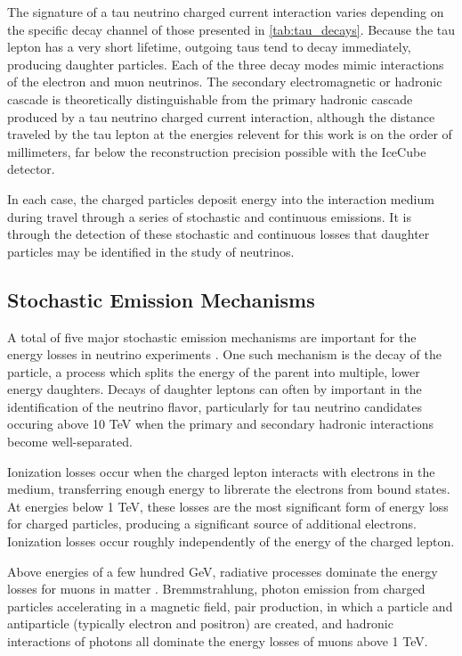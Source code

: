 The signature of a tau neutrino charged current interaction varies depending on the specific decay channel of those presented in \ref{tab:tau_decays}.
Because the tau lepton has a very short lifetime, outgoing taus tend to decay immediately, producing daughter particles.
Each of the three decay modes mimic interactions of the electron and muon neutrinos.
The secondary electromagnetic or hadronic cascade is theoretically distinguishable from the primary hadronic cascade produced by a tau neutrino charged current interaction, although the distance traveled by the tau lepton at the energies relevent for this work is on the order of millimeters, far below the reconstruction precision possible with the IceCube detector.

In each case, the charged particles deposit energy into the interaction medium during travel through a series of stochastic and continuous emissions.
It is through the detection of these stochastic and continuous losses that daughter particles may be identified in the study of neutrinos.

\subsection{Stochastic Emission Mechanisms}
A total of five major stochastic emission mechanisms are important for the energy losses in neutrino experiments \cite{Dima-MMC}.
One such mechanism is the decay of the particle, a process which splits the energy of the parent into multiple, lower energy daughters.
Decays of daughter leptons can often by important in the identification of the neutrino flavor, particularly for tau neutrino candidates occuring above 10 TeV when the primary and secondary hadronic interactions become well-separated.

Ionization losses occur when the charged lepton interacts with electrons in the medium, transferring enough energy to librerate the electrons from bound states.
At energies below 1 TeV, these losses are the most significant form of energy loss for charged particles, producing a significant source of additional electrons.
Ionization losses occur roughly independently of the energy of the charged lepton.

Above energies of a few hundred GeV, radiative processes dominate the energy losses for muons in matter \cite{PDG-2015}.
Bremmstrahlung, photon emission from charged particles accelerating in a magnetic field, pair production, in which a particle and antiparticle (typically electron and positron) are created, and hadronic interactions of photons all dominate the energy losses of muons above 1 TeV.

